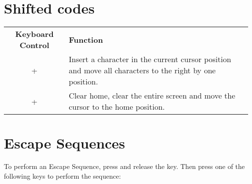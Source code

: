 \section{Shifted codes}
\label{appendix:shiftedcodes}

\begin{center}
\begin{longtable}{c|L{5.5cm}}
	\textbf{Keyboard Control} & \textbf{Function}\\
  \hhline{==}
	\endhead

 +  &
Insert a character in the current cursor position and move all characters to the right by one position.\\
\hline
{} +  &
Clear home, clear the entire screen and move the cursor to the home position.\\
\hline

\end{longtable}
\end{center}


\newpage



\section{Escape Sequences}
\label{appendix:escapesequences}

To perform an Escape Sequence, press and release the  key. Then press one of the following keys to perform the sequence:

